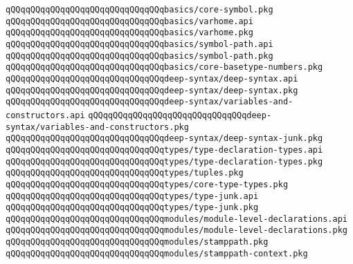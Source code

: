 \verb|qQQqqQQqqQQqqQQqqQQqqQQqqQQqqQQqbasics/core-symbol.pkg|\newline
\verb|qQQqqQQqqQQqqQQqqQQqqQQqqQQqqQQqbasics/varhome.api|\newline
\verb|qQQqqQQqqQQqqQQqqQQqqQQqqQQqqQQqbasics/varhome.pkg|\newline
\verb|qQQqqQQqqQQqqQQqqQQqqQQqqQQqqQQqbasics/symbol-path.api|\newline
\verb|qQQqqQQqqQQqqQQqqQQqqQQqqQQqqQQqbasics/symbol-path.pkg|\newline
\verb|qQQqqQQqqQQqqQQqqQQqqQQqqQQqqQQqbasics/core-basetype-numbers.pkg|\newline
\newline
\verb|qQQqqQQqqQQqqQQqqQQqqQQqqQQqqQQqdeep-syntax/deep-syntax.api|\newline
\verb|qQQqqQQqqQQqqQQqqQQqqQQqqQQqqQQqdeep-syntax/deep-syntax.pkg|\newline
\verb|qQQqqQQqqQQqqQQqqQQqqQQqqQQqqQQqdeep-syntax/variables-and-constructors.api|\newline
\verb|qQQqqQQqqQQqqQQqqQQqqQQqqQQqqQQqdeep-syntax/variables-and-constructors.pkg|\newline
\verb|qQQqqQQqqQQqqQQqqQQqqQQqqQQqqQQqdeep-syntax/deep-syntax-junk.pkg|\newline
\newline
\verb|qQQqqQQqqQQqqQQqqQQqqQQqqQQqqQQqtypes/type-declaration-types.api|\newline
\verb|qQQqqQQqqQQqqQQqqQQqqQQqqQQqqQQqtypes/type-declaration-types.pkg|\newline
\newline
\verb|qQQqqQQqqQQqqQQqqQQqqQQqqQQqqQQqtypes/tuples.pkg|\newline
\verb|qQQqqQQqqQQqqQQqqQQqqQQqqQQqqQQqtypes/core-type-types.pkg|\newline
\verb|qQQqqQQqqQQqqQQqqQQqqQQqqQQqqQQqtypes/type-junk.api|\newline
\verb|qQQqqQQqqQQqqQQqqQQqqQQqqQQqqQQqtypes/type-junk.pkg|\newline
\newline
\verb|qQQqqQQqqQQqqQQqqQQqqQQqqQQqqQQqmodules/module-level-declarations.api|\newline
\verb|qQQqqQQqqQQqqQQqqQQqqQQqqQQqqQQqmodules/module-level-declarations.pkg|\newline
\verb|qQQqqQQqqQQqqQQqqQQqqQQqqQQqqQQqmodules/stamppath.pkg|\newline
\verb|qQQqqQQqqQQqqQQqqQQqqQQqqQQqqQQqmodules/stamppath-context.pkg|\newline
